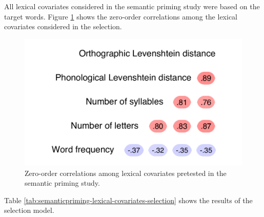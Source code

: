 \documentclass[
  12pt,
  man,floatsintext]{apa7}
\begin{document}
All lexical covariates considered in the semantic priming study were based on the target words. Figure \ref{fig:semanticpriming-lexical-covariates-correlations} shows the zero-order correlations among the lexical covariates considered in the selection.

\begin{figure}

{\centering \includegraphics[width=0.5\linewidth]{manuscript_files/figure-latex/semanticpriming-lexical-covariates-correlations-1} 

}

\caption{Zero-order correlations among lexical covariates pretested in the semantic priming study.}\label{fig:semanticpriming-lexical-covariates-correlations}
\end{figure}

Table \ref{tab:semanticpriming-lexical-covariates-selection} shows the results of the selection model.
\end{document}
